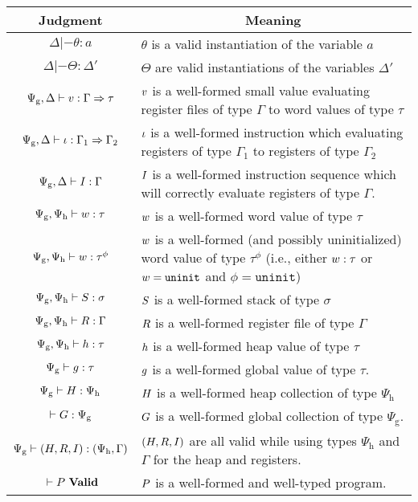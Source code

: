 \begin{tabular}{|c|p{7.5 cm}|}
  \hline
  Judgment & \multicolumn{1}{|c|}{Meaning} \\
  \hline

  $\Delta |- \theta : a$ & $\theta$ is a valid instantiation of the variable $a$ \\
  $\Delta |- \Theta : \Delta'$ & $\Theta$ are valid instantiations of the variables $\Delta'$ \\
  \hline

  $\Psi_{\mathrm{g}}, \Delta |- v : \Gamma => \tau$ & $v$ is a well-formed small value evaluating register files of type $\Gamma$ to word values of type $\tau$ \\
  $\Psi_{\mathrm{g}}, \Delta |- \iota : \Gamma_1 => \Gamma_2$ & $\iota$ is a well-formed instruction which evaluating registers of type $\Gamma_1$ to registers of type $\Gamma_2$ \\
  $\Psi_{\mathrm{g}}, \Delta |- I : \Gamma$ & $I$ is a well-formed instruction sequence which will correctly evaluate registers of type $\Gamma$. \\
  \hline

  $\Psi_{\mathrm{g}}, \Psi_{\mathrm{h}} |- w : \tau$ & $w$ is a well-formed word value of type $\tau$ \\
  $\Psi_{\mathrm{g}}, \Psi_{\mathrm{h}} |- w : \tau^{\phi}$ & $w$ is a well-formed (and possibly uninitialized) word value of type $\tau^\phi$ (i.e., either $w : \tau$ or $w = \mathtt{uninit}$ and $\phi = \mathtt{uninit}$) \\
  $\Psi_{\mathrm{g}}, \Psi_{\mathrm{h}} |- S : \sigma$ & $S$ is a well-formed stack of type $\sigma$ \\
  $\Psi_{\mathrm{g}}, \Psi_{\mathrm{h}} |- R : \Gamma$ & $R$ is a well-formed register file of type $\Gamma$ \\
  $\Psi_{\mathrm{g}}, \Psi_{\mathrm{h}} |- h : \tau$ & $h$ is a well-formed heap value of type $\tau$ \\
  $\Psi_{\mathrm{g}} |- g : \tau$ & $g$ is a well-formed global value of type $\tau$. \\
  $\Psi_{\mathrm{g}} |- H : \Psi_{\mathrm{h}}$ & $H$ is a well-formed heap collection of type $\Psi_{\mathrm{h}}$ \\
  $|- G : \Psi_{\mathrm{g}}$ & $G$ is a well-formed global collection of type $\Psi_{\mathrm{g}}$. \\
  \hline

  $\Psi_{\mathrm{g}} |- (H, R, I) : (\Psi_{\mathrm{h}}, \Gamma)$ & $(H, R, I)$ are all valid while using types $\Psi_{\mathrm{h}}$ and $\Gamma$ for the heap and registers. \\
  ${} |- {P}\ \mathbf{Valid}$ & $P$ is a well-formed and well-typed program. \\
  \hline
\end{tabular}

